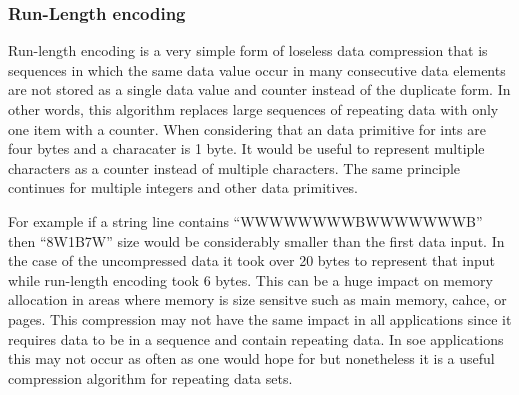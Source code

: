 \documentclass[letterpaper, 12pt]{article}
\begin{document}
\subsubsection{Run-Length encoding}
Run-length encoding is a very simple form of loseless data compression that is sequences
in which the same data value occur in many consecutive data elements are not stored as a
single data value and counter instead of the duplicate form. In other words, this algorithm
replaces large sequences of repeating data with only one item with a counter. When considering
that an data primitive for ints are four bytes and a characater is 1 byte. It would be useful
to represent multiple characters as a counter instead of multiple characters. The same principle
continues for multiple integers and other data primitives.
\par\vspace{\baselineskip}
For example if a string line contains ``WWWWWWWWBWWWWWWWB'' then ``8W1B7W'' size would be considerably
smaller than the first data input. In the case of the uncompressed data it took over 20 bytes to
represent that input while run-length encoding took 6 bytes. This can be a huge impact on memory
allocation in areas where memory is size sensitve such as main memory, cahce, or pages.
This compression may not have the same impact in all applications since it requires data to be
in a sequence and contain repeating data. In soe applications this may not occur as often as one would
hope for but nonetheless it is a useful compression algorithm for repeating data sets.
\end{document}
